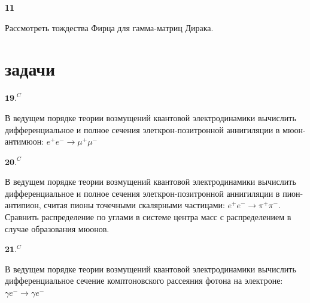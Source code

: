 \documentclass[a4paper,12pt]{article} %
\begin{document}
\begin{task}\textbf{11}

Рассмотреть тождества Фирца для гамма-матриц Дирака.












\end{task}



\section{задачи}


\begin{ttask} $\mathbf{1 9 .}^{C}$ 

В ведущем порядке теории возмущений квантовой электродинамики вычислить 
дифференциальное и полное сечения элеткрон-позитронной аннигиляции в мюон-антимюон: 
$e^{+} e^{-} \rightarrow \mu^{+} \mu^{-}$









\end{ttask}



\begin{ttask} $\mathbf{2 0 .}^{C}$ 
	
В ведущем порядке теории возмущений квантовой электродинамики вычислить дифференциальное и полное сечения элеткрон-позитронной аннигиляции в пион-антипион, 
считая пионы точечными скалярными частицами: $e^{+} e^{-} \rightarrow \pi^{+} \pi^{-} .$ 
Сравнить распределение по углами в системе центра масс с распределением в случае образования мюонов.














\end{ttask}



\begin{ttask} $\mathbf{2 1 .}^{C}$ 

В ведущем порядке теории возмущений квантовой электродинамики 
вычислить дифференциальное сечение комптоновского рассеяния фотона на электроне: $\gamma e^{-} \rightarrow \gamma e^{-}$























\end{ttask}
\end{document}
